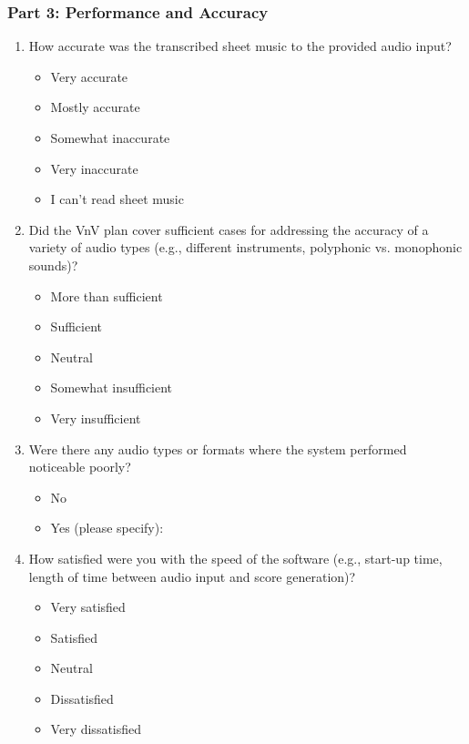 \documentclass[12pt, titlepage]{article}
\begin{document}
\subsubsection*{Part 3: Performance and Accuracy}
\begin{enumerate}[resume, leftmargin=*]
  \item How accurate was the transcribed sheet music to the provided audio input?
  \begin{itemize}
    \item Very accurate
    \item Mostly accurate
    \item Somewhat inaccurate
    \item Very inaccurate
    \item I can’t read sheet music
  \end{itemize}
  \item Did the VnV plan cover sufficient cases for addressing the accuracy of a variety of audio types (e.g., different instruments, polyphonic vs. monophonic sounds)?
  \begin{itemize}
    \item More than sufficient
    \item Sufficient
    \item Neutral 
    \item Somewhat insufficient
    \item Very insufficient
  \end{itemize}
  \item Were there any audio types or formats where the system performed noticeable poorly?
  \begin{itemize}
    \item No
    \item Yes (please specify): \hrulefill
  \end{itemize}
  \item How satisfied were you with the speed of the software (e.g., start-up time, length of time between audio input and score generation)?
  \begin{itemize}
    \item Very satisfied
    \item Satisfied
    \item Neutral
    \item Dissatisfied
    \item Very dissatisfied
  \end{itemize}
\end{enumerate}
\end{document}
